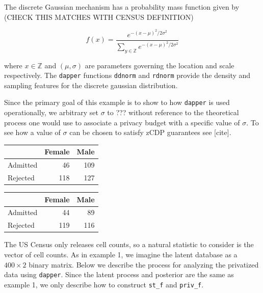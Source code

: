 The discrete Gaussian mechanism has a probability mass function given by (CHECK THIS
MATCHES WITH CENSUS DEFINITION)

\[
f(x) = \dfrac{e^{-(x - \mu)^2/2\sigma^2}}{\sum_{y \in \mathbb{Z}} e^{-(x-\mu)^2/2\sigma^2}}
\]

where \(x \in \mathbb{Z}\) and \((\mu,\sigma)\) are parameters governing the location and
scale respectively. The \texttt{dapper} functions \texttt{ddnorm} and \texttt{rdnorm} provide the
density and sampling features for the discrete gaussian distribution.

Since the primary goal of this example is to
show to how \texttt{dapper} is used operationally, we arbitrary set
\(\sigma\) to ??? without reference to the theoretical process one would use to
associate a privacy budget with a specific value of \(\sigma\). To see how a value of
\(\sigma\) can be chosen to satisfy zCDP guarantees see {[}cite{]}.

\begin{table}[!h]
\centering
\centering
\begin{tabular}[t]{lrr}
\toprule
  & Female & Male\\
\midrule
Admitted & 46 & 109\\
Rejected & 118 & 127\\
\bottomrule
\end{tabular}
\centering
\begin{tabular}[t]{lrr}
\toprule
  & Female & Male\\
\midrule
Admitted & 44 & 89\\
Rejected & 119 & 116\\
\bottomrule
\end{tabular}
\end{table}

The US Census only releases cell counts, so a natural
statistic to consider is the vector of cell counts. As in
example 1, we imagine the latent database as a
\(400 \times 2\) binary matrix. Below
we describe the process for analyzing the privatized
data using \texttt{dapper}. Since the latent process
and posterior are the same as example 1, we only describe
how to construct \texttt{st\_f} and \texttt{priv\_f}.

